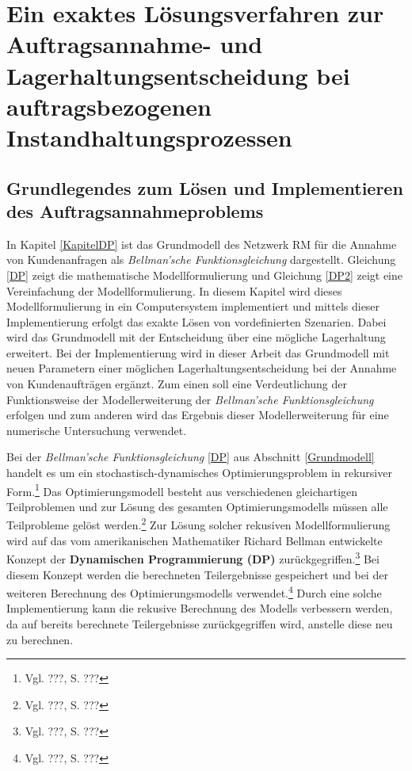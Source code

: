 \chapter{Ein exaktes Lösungsverfahren zur Auftragsannahme- und Lagerhaltungsentscheidung bei auftragsbezogenen Instandhaltungsprozessen}\label{HauptteilDP}
\setcounter{footnote}{7}

\section{Grundlegendes zum Lösen und Implementieren des Auftragsannahmeproblems}\label{Implementierung}

In Kapitel \ref{KapitelDP} ist das Grundmodell des Netzwerk RM für die Annahme von Kundenanfragen als \textit{Bellman'sche Funktionsgleichung} dargestellt. Gleichung \eqref{DP} zeigt die mathematische Modellformulierung und Gleichung \eqref{DP2} zeigt eine Vereinfachung der Modellformulierung. In diesem Kapitel wird dieses Modellformulierung in ein Computersystem implementiert und mittels dieser Implementierung erfolgt das exakte Lösen von vordefinierten Szenarien. Dabei wird das Grundmodell mit der Entscheidung über eine mögliche Lagerhaltung erweitert. Bei der Implementierung wird in dieser Arbeit das Grundmodell mit neuen Parametern einer möglichen Lagerhaltungsentscheidung bei der Annahme von Kundenaufträgen ergänzt. Zum einen soll eine Verdeutlichung der Funktionsweise der Modellerweiterung der \textit{Bellman'sche Funktionsgleichung} erfolgen und zum anderen wird das Ergebnis dieser Modellerweiterung für eine numerische Untersuchung verwendet.

Bei der \textit{Bellman'sche Funktionsgleichung} \eqref{DP} aus Abschnitt \ref{Grundmodell} handelt es um ein stochastisch-dynamisches Optimierungsproblem in rekursiver Form.\footnote{Vgl. ???, S. ???} Das Optimierungsmodell besteht aus verschiedenen gleichartigen Teilproblemen und zur Lösung des gesamten Optimierungsmodells müssen alle Teilprobleme gelöst werden.\footnote{Vgl. ???, S. ???} Zur Lösung solcher rekusiven Modellformulierung wird auf das vom amerikanischen Mathematiker Richard Bellman entwickelte Konzept der \textbf{Dynamischen Programmierung (DP)} zurückgegriffen.\footnote{Vgl. ???, S. ???} Bei diesem Konzept werden die berechneten Teilergebnisse gespeichert und bei der weiteren Berechnung des Optimierungsmodells verwendet.\footnote{Vgl. ???, S. ???} Durch eine solche Implementierung kann die rekusive Berechnung des Modells verbessern werden, da auf bereits berechnete Teilergebnisse zurückgegriffen wird, anstelle diese neu zu berechnen.

